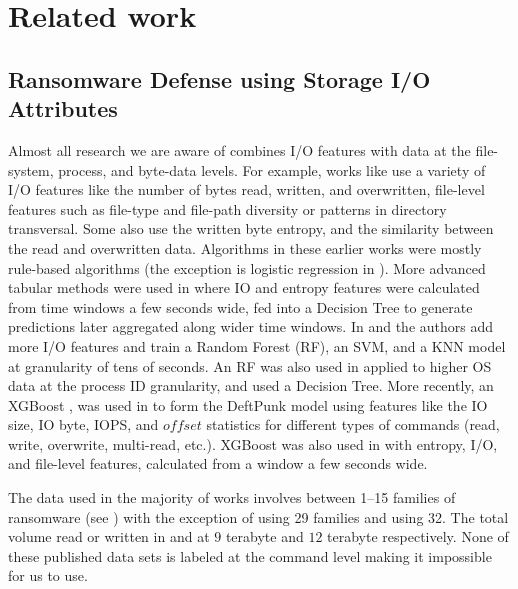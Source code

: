 \section{Related work}
\subsection{Ransomware Defense using Storage I/O Attributes}
\label{RW_w_IO}
Almost all research we are aware of combines I/O features with data at the file-system, process, and byte-data levels. For example, works like \cite{Shukla-et-al, Kharaz-et-al-Redemption-2017, Paik-et-al-2018, Amoeba-2018, Wang-et-al-Mimosa-2019} use a variety of I/O features like the number of bytes read, written, and overwritten, file-level features such as file-type and file-path diversity or patterns in directory transversal. Some also use the written byte entropy, and the similarity between the read and overwritten data. Algorithms in these earlier works were mostly rule-based algorithms (the exception is logistic regression in \cite{Amoeba-2018}). More advanced tabular methods were used in \cite{SSD-insider-2018, Baek-et-al-SSD++-2021} where IO and entropy features were calculated from time windows a few seconds wide, fed into a Decision Tree to generate predictions later aggregated along wider time windows. In \cite{Hirano-et-al-2022a} and \cite{Hirano-et-al-2022b} the authors add more I/O features and train a Random Forest (RF), an SVM, and a KNN model at granularity of tens of seconds. An RF was also used in \cite{eBPF-2023} applied to higher OS data at the process ID granularity, and \cite{Minding_the_Semantic_Gap-2024} used a Decision Tree. More recently, an XGBoost \cite{xgboost-paper}, was used in \cite{Wang2024-alibaba} to form the DeftPunk model using features like the IO size, IO byte, IOPS, and $offset$ statistics for different types of commands (read, write, overwrite, multi-read, etc.). XGBoost was also used in \cite{reategui2024_ibm} with entropy, I/O, and file-level features, calculated from a window a few seconds wide.

The data used in the majority of works involves between 1--15 families of ransomware (see \cite{Amoeba-2018, SSD-insider-2018, Wang-et-al-Mimosa-2019, Baek-et-al-SSD++-2021, Hirano-et-al-2022b, eBPF-2023, Minding_the_Semantic_Gap-2024, Wang2024-alibaba}) with the exception of \cite{Kharaz-et-al-Redemption-2017} using 29 families and \cite{TravellingHypervisor} using 32. 
The total volume read or written in \cite{Hirano-et-al-2022a} and \cite{Wang2024-alibaba} at $9$ terabyte and $12$ terabyte respectively. 
None of these published data sets is labeled at the command level making it impossible for us to use.

